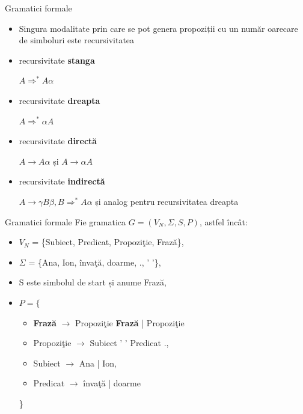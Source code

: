 \documentclass[pdf]{beamer}
\begin{document}
\begin{frame}{Gramatici formale}
\begin{itemize}
\item
Singura modalitate prin care se pot genera propoziții cu un număr oarecare de simboluri este recursivitatea
\item
recursivitate \textbf{stanga}

$A \Rightarrow^{*} A \alpha$
\item
recursivitate \textbf{dreapta}  

$A \Rightarrow^{*} \alpha A$
\item
recursivitate \textbf{directă} 

$A \rightarrow A \alpha$ și $A \rightarrow \alpha A$
\item
recursivitate \textbf{indirectă} 

$A \rightarrow \gamma B \beta, B \Rightarrow^{*} A \alpha$ și analog pentru recursivitatea dreapta
\end{itemize}
\end{frame}



\begin{frame}{Gramatici formale}
Fie gramatica $G = (V_{N}, \Sigma, S, P)$, astfel încât:

\begin{itemize}
\item
$V_{N}$ = \{Subiect, Predicat, Propoziţie, Frază\},
\item
$\Sigma$ = \{Ana, Ion, învaţă, doarme, ., ' '\},
\item
S este simbolul de start și anume Frază,
\item
$P = \{$
\begin{itemize}
\item
\textbf{Frază} $\rightarrow$ Propoziţie \textbf{Frază} | Propoziţie
\item
Propoziţie $\rightarrow$ Subiect ' ' Predicat .,
\item
Subiect $\rightarrow$ Ana | Ion,
\item
Predicat $\rightarrow$ învaţă | doarme
\end{itemize}
\}
\end{itemize}
\end{frame}
\end{document}

